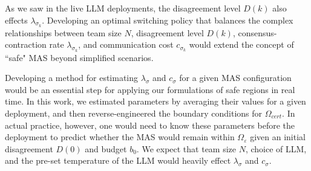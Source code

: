 \documentclass[journal,twoside,web]{ieeecolor_no_firstpage_logo}
\begin{document}
As we saw in the live LLM deployments, the disagreement level $D(k)$ also effects $\lambda_{\sigma_k}.$ Developing an optimal switching policy that balances the complex relationships between team size $N$, disagreement level $D(k)$, consensus-contraction rate $\lambda_{\sigma_k}$, and communication cost $c_{\sigma_k}$ would extend the concept of ``safe" MAS beyond simplified scenarios. 

Developing a method for estimating $\lambda_\sigma$ and $c_\sigma$ for a given MAS configuration would be an essential step for applying our formulations of safe regions in real time. In this work, we estimated parameters by averaging their values for a given deployment, and then reverse-engineered the boundary conditions for $\Omega_{cert}$. In actual practice, however, one would need to know these parameters before the deployment to predict whether the MAS would remain within $\Omega_{\varepsilon}$ given an initial disagreement $D(0)$ and budget $b_0.$ We expect that team size $N$, choice of LLM, and the pre-set temperature of the LLM would heavily effect $\lambda_\sigma$ and $c_\sigma.$
\end{document}
